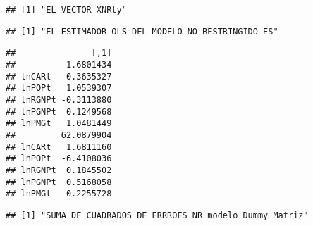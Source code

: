 \documentclass[
]{article}
\newenvironment{Shaded}{\begin{snugshade}}{\end{snugshade}}
\newcommand{\DataTypeTok}[1]{\textcolor[rgb]{0.13,0.29,0.53}{#1}}
\newcommand{\KeywordTok}[1]{\textcolor[rgb]{0.13,0.29,0.53}{\textbf{#1}}}
\newcommand{\NormalTok}[1]{#1}
\newcommand{\OperatorTok}[1]{\textcolor[rgb]{0.81,0.36,0.00}{\textbf{#1}}}
\newcommand{\StringTok}[1]{\textcolor[rgb]{0.31,0.60,0.02}{#1}}
\begin{document}
\begin{verbatim}
## [1] "EL VECTOR XNRty"
\end{verbatim}

\begin{Shaded}
\end{Shaded}

\begin{verbatim}
## [1] "EL ESTIMADOR OLS DEL MODELO NO RESTRINGIDO ES"
\end{verbatim}

\begin{Shaded}
\end{Shaded}

\begin{verbatim}
##               [,1]
##          1.6801434
## lnCARt   0.3635327
## lnPOPt   1.0539307
## lnRGNPt -0.3113880
## lnPGNPt  0.1249568
## lnPMGt   1.0481449
##         62.0879904
## lnCARt   1.6811160
## lnPOPt  -6.4108036
## lnRGNPt  0.1845502
## lnPGNPt  0.5168058
## lnPMGt  -0.2255728
\end{verbatim}

\begin{Shaded}
\end{Shaded}

\begin{verbatim}
## [1] "SUMA DE CUADRADOS DE ERRROES NR modelo Dummy Matriz"
\end{verbatim}

\begin{Shaded}
\end{Shaded}
\end{document}
